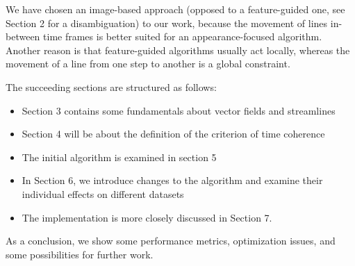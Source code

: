 We have chosen an image-based approach (opposed to a feature-guided one, see Section 2 for a disambiguation) to our work,
because the movement of lines in-between time frames is better suited for an appearance-focused algorithm.
Another reason is that feature-guided algorithms usually act locally, whereas the movement of a line from one step to another
is a global constraint.

The succeeding sections are structured as follows:
\begin{itemize}
    \item Section 3 contains some fundamentals about vector fields and streamlines
    \item Section 4 will be about the definition of the criterion of time coherence
    \item The initial algorithm is examined in section 5
    \item In Section 6, we introduce changes to the algorithm and examine their individual effects on different datasets
    \item The implementation is more closely discussed in Section 7.
\end{itemize}
As a conclusion, we show some performance metrics, optimization issues, and some possibilities for further work.
